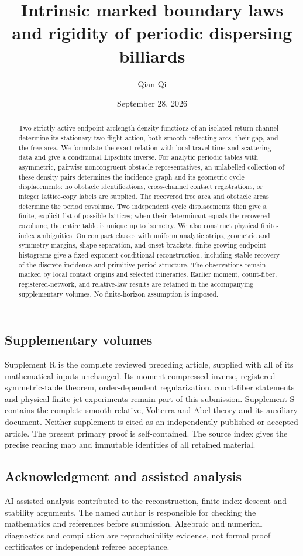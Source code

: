 \documentclass[11pt]{amsart}
\title[Intrinsic marked boundary laws]{Intrinsic marked boundary laws and rigidity of periodic dispersing billiards}
\author{Qian Qi}
\date{September 28, 2026}
\theoremstyle{definition}\newtheorem{definition}[theorem]{Definition}
\theoremstyle{remark}\newtheorem{remark}[theorem]{Remark}
\numberwithin{equation}{section}
\begin{document}
\begin{abstract}
Two strictly active endpoint-arclength density functions of an isolated
return channel determine its stationary two-flight action, both smooth
reflecting arcs, their gap, and the free area. We formulate the exact
relation with local travel-time and scattering data and give a conditional
Lipschitz inverse. For analytic periodic tables with asymmetric,
pairwise noncongruent obstacle representatives, an unlabelled collection
of these density pairs determines the incidence graph and its geometric
cycle displacements: no obstacle identifications, cross-channel contact
registrations, or integer lattice-copy labels are supplied. The recovered
free area and obstacle areas determine the period covolume. Two independent
cycle displacements then give a finite, explicit list of possible lattices;
when their determinant equals the recovered covolume, the entire table
is unique up to isometry. We also construct physical finite-index
ambiguities. On compact classes with uniform analytic strips, geometric
and symmetry margins, shape separation, and onset brackets, finite growing
endpoint histograms give a fixed-exponent conditional reconstruction,
including stable recovery of the discrete incidence and primitive period
structure. The observations remain marked by local contact origins and
selected itineraries. Earlier moment, count-fiber, registered-network,
and relative-law results are retained in the accompanying supplementary
volumes. No finite-horizon assumption is imposed.
\end{abstract}
\maketitle





\subsection*{Supplementary volumes}
Supplement R is the complete reviewed preceding article, supplied with
all of its mathematical inputs unchanged. Its moment-compressed inverse,
registered symmetric-table theorem, order-dependent regularization,
count-fiber statements and physical finite-jet experiments remain part
of this submission. Supplement S contains the complete smooth relative,
Volterra and Abel theory and its auxiliary document. Neither supplement
is cited as an independently published or accepted article. The present
primary proof is self-contained. The source index gives the precise
reading map and immutable identities of all retained material.
\subsection*{Acknowledgment and assisted analysis}
AI-assisted analysis contributed to the reconstruction, finite-index
descent and stability arguments. The named author is responsible for
checking the mathematics and references before submission. Algebraic
and numerical diagnostics and compilation are reproducibility evidence,
not formal proof certificates or independent referee acceptance.

\end{document}

